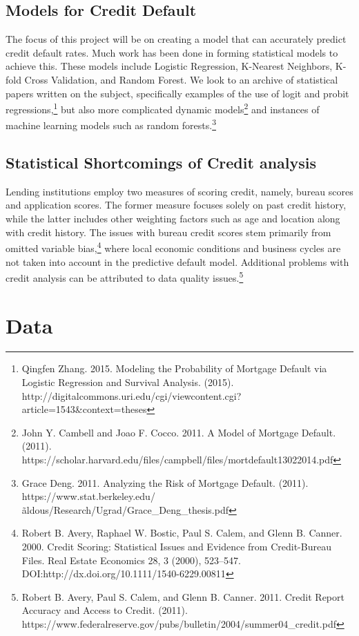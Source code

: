 \documentclass[sigconf, 11pt]{acmart}
\begin{document}
\subsection{Models for Credit Default}
The focus of this project will be on creating a model that can accurately predict credit default rates. Much work has been done in forming statistical models to achieve this. These models include Logistic Regression, K-Nearest Neighbors, K-fold Cross Validation, and Random Forest. We look to an archive of statistical papers written on the subject, specifically examples of the use of logit and probit regressions,\footnote{Qingfen Zhang. 2015. Modeling the Probability of Mortgage Default via Logistic Regression and Survival Analysis. (2015). http://digitalcommons.uri.edu/cgi/viewcontent.cgi?article=1543\&context=theses} but also more complicated dynamic models\footnote{John Y. Cambell and Joao F. Cocco. 2011. A Model of Mortgage Default. (2011). https://scholar.harvard.edu/files/campbell/files/mortdefault13022014.pdf} and instances of machine learning models such as random forests.\footnote{Grace Deng. 2011. Analyzing the Risk of Mortgage Default. (2011). https://www.stat.berkeley.edu/\~aldous/Research/Ugrad/Grace\_Deng\_thesis.pdf}

\subsection{Statistical Shortcomings of Credit analysis}
Lending institutions employ two measures of scoring credit, namely, bureau scores and application scores. The former measure focuses solely on past credit history, while the latter includes other weighting factors such as age and location along with credit history. The issues with bureau credit scores stem primarily from omitted variable bias,\footnote{Robert B. Avery, Raphael W. Bostic, Paul S. Calem, and Glenn B. Canner. 2000. Credit Scoring: Statistical Issues and Evidence from Credit-Bureau Files. Real Estate Economics 28, 3 (2000), 523–547. DOI:http://dx.doi.org/10.1111/1540-6229.00811} where local economic conditions and business cycles are not taken into account in the predictive default model. Additional problems with credit analysis can be attributed to data quality issues.\footnote{Robert B. Avery, Paul S. Calem, and Glenn B. Canner. 2011. Credit Report Accuracy and Access to Credit. (2011). https://www.federalreserve.gov/pubs/bulletin/2004/summer04\_credit.pdf}

\section{Data}
\end{document}
